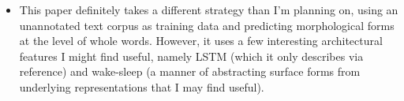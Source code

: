 \documentclass[12pt]{report}
\begin{document}

\begin{itemize}
	
	\item This paper definitely takes a different strategy than I'm planning on, using an unannotated text corpus as training data and predicting morphological forms at the level of whole words. However, it uses a few interesting architectural features I might find useful, namely LSTM (which it only describes via reference) and wake-sleep (a manner of abstracting surface forms from underlying representations that I may find useful).
	
\end{itemize}



\end{document}
